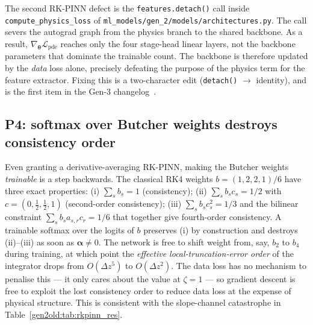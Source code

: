 \documentclass[a4paper,11pt]{article}
\newcommand{\dz}{\Delta z}
\newcommand{\loss}{\mathcal{L}}
\newcommand{\btheta}{\bm{\theta}}
\begin{document}
The second RK-PINN defect is the \texttt{features.detach()} call inside
\texttt{compute\_physics\_loss} of
\texttt{ml\_models/gen\_2/models/architectures.py}. The call severs the
autograd graph from the physics branch to the shared backbone. As a
result, $\nabla_{\btheta} \loss_{\mathrm{pde}}$ reaches only the four
stage-head linear layers, not the backbone parameters that dominate the
trainable count. The backbone is therefore updated by the \emph{data}
loss alone, precisely defeating the purpose of the physics term for the
feature extractor. Fixing this is a two-character edit
(\texttt{detach()} $\to$ identity), and is the first item in the Gen-3
changelog~\cite{gen2newreport}.

\subsection{P4: softmax over Butcher weights destroys consistency order}
\label{gen2old:sub:p4}

Even granting a derivative-averaging RK-PINN, making the Butcher weights
\emph{trainable} is a step backwards. The classical RK4 weights
$b=(1,2,2,1)/6$ have three exact properties: (i) $\sum_s b_s = 1$
(consistency); (ii) $\sum_s b_s c_s = 1/2$ with
$c=(0,\tfrac12,\tfrac12,1)$ (second-order consistency); (iii)
$\sum_s b_s c_s^2 = 1/3$ and the bilinear constraint
$\sum_s b_s a_{s,r} c_r = 1/6$ that together give fourth-order
consistency. A trainable softmax over the logits of $b$ preserves
(i) by construction and destroys (ii)--(iii) as soon as $\bm{\alpha}\neq 0$.
The network is free to shift weight from, say, $b_2$ to $b_4$ during
training, at which point the \emph{effective local-truncation-error
order} of the integrator drops from $O(\dz^5)$ to $O(\dz^2)$. The data
loss has no mechanism to penalise this --- it only cares about the value
at $\zeta=1$ --- so gradient descent is free to exploit the lost
consistency order to reduce data loss at the expense of physical
structure. This is consistent with the slope-channel catastrophe in
Table~\ref{gen2old:tab:rkpinn_res}.
\end{document}
